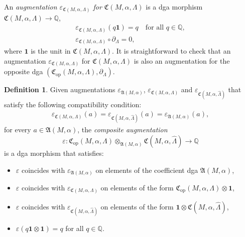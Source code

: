 \documentclass[JEP,XML,SOM,Unicode,NoFloatCountersInSection]{cedram}
\let\epsilon\varepsilon
\newcommand{\opp}{\mathrm{op}}
\theoremstyle{plain}
\theoremstyle{definition}
\newtheorem{defn}[thm]{Definition}
\numberwithin{equation}{subsection}
\begin{document}
An {\em augmentation $\epsilon_{\mathfrak{C}(M,\alpha,\Lambda)}$ for $\mathfrak{C}(M,\alpha,\Lambda)$} is a dga morphism $\mathfrak{C}(M,\alpha,\Lambda)\to\mathbb{Q}$, \ie
\begin{gather}
\epsilon_{\mathfrak{C}(M,\alpha,\Lambda)} (q \mathbf{1}) = q \quad\mbox{for all } q \in \mathbb{Q},\\
\epsilon_{\mathfrak{C}(M,\alpha,\Lambda)} \circ \partial_{\Lambda} =0,
\end{gather}
where $\mathbf{1}$ is the unit in $\mathfrak{C}(M,\alpha,\Lambda)$. It is straightforward to check that an augmentation $\epsilon_{\mathfrak{C}(M,\alpha,\Lambda)}$ for $\mathfrak{C}(M,\alpha,\Lambda)$ is also an augmentation for the opposite dga $(\mathfrak{C}_{\opp}(M,\alpha,\Lambda),\partial_\Lambda)$.

\begin{defn}
Given augmentations $\epsilon_{\mathfrak{A}(M,\alpha)}$, $\epsilon_{\mathfrak{C}(M,\alpha,\Lambda)}$ and $\epsilon_{\mathfrak{C}(M,\alpha,\widehat{\Lambda})}$ that satisfy the following compatibility condition:
\begin{gather}
\epsilon_{\mathfrak{C}(M,\alpha,\Lambda)}(a) = \epsilon_{\mathfrak{C}(M,\alpha,\widehat{\Lambda})} (a) = \epsilon_{\mathfrak{A}(M,\alpha)}(a),
\end{gather}
for every $a \in \mathfrak{A}(M,\alpha)$, the {\em composite augmentation}
\begin{equation}%
\epsilon:\mathfrak{C}_{\opp}(M,\alpha,\Lambda) \otimes_{\mathfrak{A}(M,\alpha)} \mathfrak{C}(M,\alpha,\widehat{\Lambda})\to\mathbb{Q}
\end{equation}
is a dga morphism that satisfies:
\begin{itemize}
\item $\epsilon$ coincides with $\epsilon_{\mathfrak{A}(M,\alpha)}$ on elements of the coefficient dga $\mathfrak{A}(M,\alpha)$,
\item $\epsilon$ coincides with $\epsilon_{\mathfrak{C}(M,\alpha,\Lambda)}$ on elements of the form $\mathfrak{C}_{\opp}(M,\alpha,\Lambda) \otimes \mathbf{1}$,
\item $\epsilon$ coincides with $\epsilon_{\mathfrak{C}(M,\alpha,\widehat{\Lambda})}$ on elements of the form $\mathbf{1} \otimes \mathfrak{C}(M,\alpha,\widehat{\Lambda})$,
\item $\epsilon(q\mathbf{1} \otimes \mathbf{1}) = q$ for all $q\in \mathbb{Q}$.
\end{itemize}
\end{defn}
\end{document}
